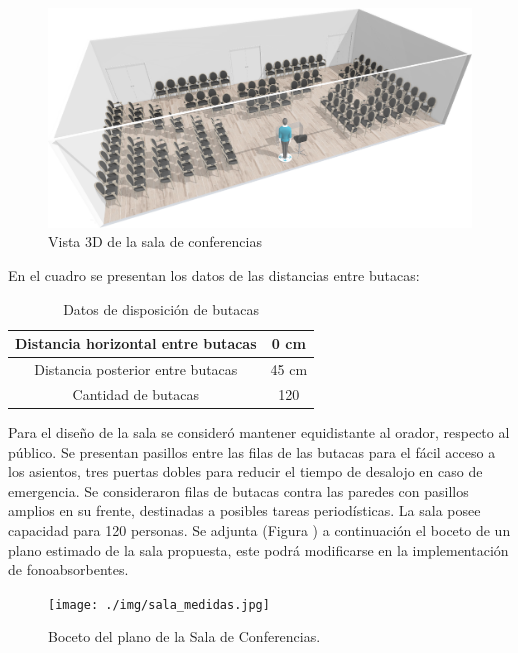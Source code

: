 \begin{figure}[H]
	\centering
	\includegraphics[width=1\textwidth]{./img/sala3D.png}
	\caption{Vista 3D de la sala de conferencias}
	\label{fig:vista_3D_sala}
\end{figure}


\par En el cuadro se presentan los datos de las distancias entre butacas:

\begin{table}[H]
\setlength\arrayrulewidth{1pt}
    \centering
    \begin{tabular}{|c|c|} \hline
        Distancia horizontal entre butacas & 0 cm  \\ \hline
        Distancia posterior entre butacas  & 45 cm  \\ \hline
        Cantidad de butacas & 120 \\ \hline
    \end{tabular}
    \caption{Datos de disposición de butacas}
    \label{tab:my_label}
\end{table}

\par Para el diseño de la sala se consideró mantener equidistante al orador, respecto al público. Se presentan pasillos entre las filas de las butacas para el fácil acceso a los asientos, tres puertas dobles para reducir el tiempo de desalojo en caso de emergencia. Se consideraron filas de butacas contra las paredes con pasillos amplios en su frente, destinadas a posibles tareas periodísticas. La sala posee capacidad para 120 personas. Se adjunta (Figura ) a continuación el boceto de un plano estimado de la sala propuesta, este podrá modificarse en la implementación de fonoabsorbentes. 


\begin{figure}[H]
	\centering
	\texttt{[image: ./img/sala\_medidas.jpg]}
	\caption{Boceto del plano de la Sala de Conferencias.}
	\label{fig:plano}
\end{figure}
